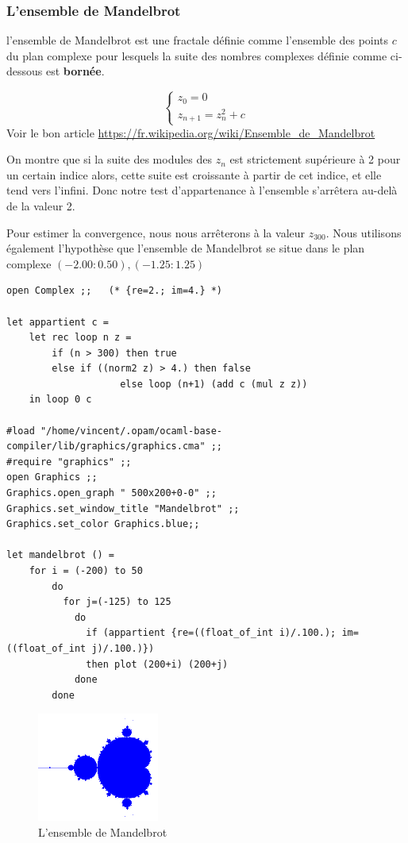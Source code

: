 \subsubsection{L'ensemble de Mandelbrot}
l'ensemble de Mandelbrot est une fractale définie comme l'ensemble des points $c$ 
du plan complexe pour lesquels la suite des nombres complexes définie comme ci-dessous est 
\textbf{bornée}.

$$
\begin{cases}
	z_0=0\\
	z_{n+1}=z_n^2+c
\end{cases}
$$
Voir le bon article \url{https://fr.wikipedia.org/wiki/Ensemble_de_Mandelbrot}

On montre que si la suite des modules des $z_n$ est strictement supérieure à 2 pour un certain indice alors,
cette suite est croissante à partir de cet indice, et elle tend vers l'infini.
Donc notre test d'appartenance à l'ensemble s'arrêtera au-delà de la valeur 2.

Pour estimer la convergence, nous nous arrêterons à la valeur $z_{300}$.
Nous utilisons également l'hypothèse que l'ensemble de Mandelbrot se situe dans le plan complexe
$(-2.00:0.50), (-1.25:1.25)$
\begin{Verbatim}
open Complex ;;   (* {re=2.; im=4.} *)

let appartient c =
	let rec loop n z =
		if (n > 300) then true
		else if ((norm2 z) > 4.) then false
					else loop (n+1) (add c (mul z z)) 
	in loop 0 c  

#load "/home/vincent/.opam/ocaml-base-compiler/lib/graphics/graphics.cma" ;;
#require "graphics" ;; 
open Graphics ;;
Graphics.open_graph " 500x200+0-0" ;;
Graphics.set_window_title "Mandelbrot" ;;
Graphics.set_color Graphics.blue;;

let mandelbrot () =
	for i = (-200) to 50
		do
		  for j=(-125) to 125
			do
			  if (appartient {re=((float_of_int i)/.100.); im=((float_of_int j)/.100.)}) 
			  then plot (200+i) (200+j) 
			done
		done 
\end{Verbatim}

\begin{figure}[H]
	\centering
	\caption{L'ensemble de Mandelbrot}
	\includegraphics[width=4.0cm]{mandelbrot.png}
\end{figure}

